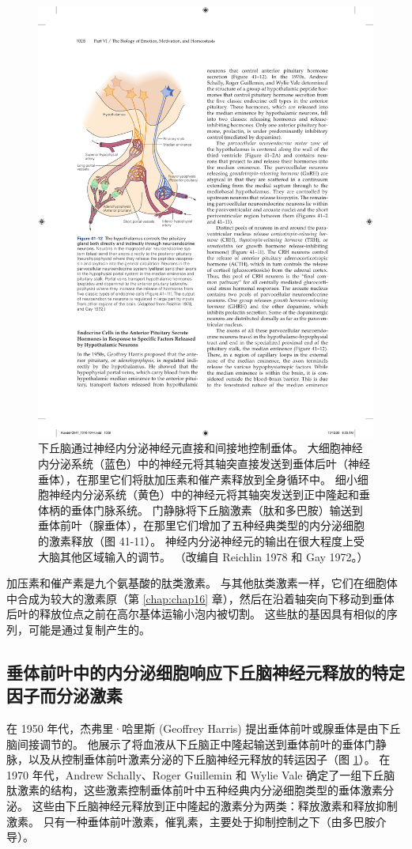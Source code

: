 \begin{figure}[htbp]
	\centering
	\includegraphics[width=0.5\linewidth]{chap41/fig_41_12}
	\caption{下丘脑通过神经内分泌神经元直接和间接地控制垂体。 大细胞神经内分泌系统（蓝色）中的神经元将其轴突直接发送到垂体后叶（神经垂体），在那里它们将肽加压素和催产素释放到全身循环中。 细小细胞神经内分泌系统（黄色）中的神经元将其轴突发送到正中隆起和垂体柄的垂体门脉系统。 门静脉将下丘脑激素（肽和多巴胺）输送到垂体前叶（腺垂体），在那里它们增加了五种经典类型的内分泌细胞的激素释放（图 41-11）。 神经内分泌神经元的输出在很大程度上受大脑其他区域输入的调节。 （改编自 Reichlin 1978 和 Gay 1972。）}
	\label{fig:41_12}
\end{figure}

加压素和催产素是九个氨基酸的肽类激素。 与其他肽类激素一样，它们在细胞体中合成为较大的激素原（第 \ref{chap:chap16} 章），然后在沿着轴突向下移动到垂体后叶的释放位点之前在高尔基体运输小泡内被切割。 这些肽的基因具有相似的序列，可能是通过复制产生的。

\subsection{垂体前叶中的内分泌细胞响应下丘脑神经元释放的特定因子而分泌激素}

在 1950 年代，杰弗里·哈里斯 (Geoffrey Harris) 提出垂体前叶或腺垂体是由下丘脑间接调节的。 他展示了将血液从下丘脑正中隆起输送到垂体前叶的垂体门静脉，以及从控制垂体前叶激素分泌的下丘脑神经元释放的转运因子（图 \ref{fig:41_12}）。 在 1970 年代，Andrew Schally、Roger Guillemin 和 Wylie Vale 确定了一组下丘脑肽激素的结构，这些激素控制垂体前叶中五种经典内分泌细胞类型的垂体激素分泌。 这些由下丘脑神经元释放到正中隆起的激素分为两类：释放激素和释放抑制激素。 只有一种垂体前叶激素，催乳素，主要处于抑制控制之下（由多巴胺介导）。

